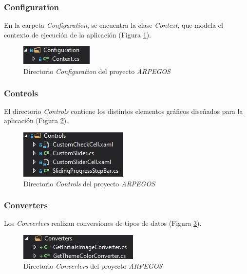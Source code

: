 {\subsubsection{Configuration}
En la carpeta \textit{Configuration}, se encuentra la clase \textit{Context}, que modela 
el contexto de ejecución de la aplicación (Figura \ref*{Configuration}).

\begin{figure}[H]
    \centering
    \includegraphics[scale=1.5]{Images/ARPEGOS_Configuration.jpg}
    \caption{Directorio \textit{Configuration} del proyecto \textit{ARPEGOS}}
    \label{Configuration}    
\end{figure}

\subsubsection{Controls}
El directorio \textit{Controls} contiene los distintos elementos gráficos diseñados para la aplicación (Figura \ref*{Controls}).

\begin{figure}[H]
    \centering
    \includegraphics[scale=1.5]{Images/ARPEGOS_Controls.jpg}
    \caption{Directorio \textit{Controls} del proyecto \textit{ARPEGOS}}
    \label{Controls}    
\end{figure}

\subsubsection{Converters}
Los \textit{Converters} realizan conversiones de tipos de datos (Figura \ref*{Converters}).

\begin{figure}[H]
    \centering
    \includegraphics[scale=1.5]{Images/ARPEGOS_Converters.jpg}
    \caption{Directorio \textit{Converters} del proyecto \textit{ARPEGOS}}
    \label{Converters}    
\end{figure}

}
